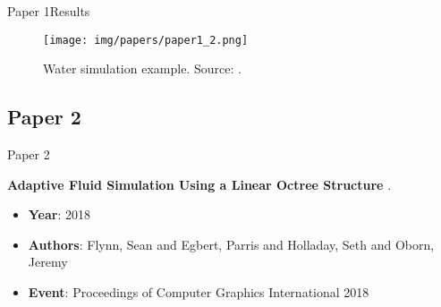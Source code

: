 \documentclass[10pt]{beamer}
\newcommand{\1}{
        	\setbeamertemplate{background}{
        		\texttt{[image: img/1]}
        		\tikz[overlay] \fill[fill opacity=0.75,fill=white] (0,0) rectangle (-\paperwidth,\paperheight);
        	}
}
\begin{document}
\begin{frame}{Paper 1}{Results}
	\begin{figure}
		\centering
		\texttt{[image: img/papers/paper1\_2.png]}
		\caption{Water simulation example. Source: \cite{ando2011particle}.}
	\end{figure}
\end{frame}

\subsection{Paper 2}


\begin{frame}{Paper 2}{}
	
	\begin{block}{}
		\centering
		\textbf{Adaptive Fluid Simulation Using a Linear Octree Structure} \cite{flynn2018adaptive}.
	\end{block}
	
	\begin{itemize}
		\item \textbf{Year}: 2018
		\item \textbf{Authors}: Flynn, Sean and Egbert, Parris and Holladay, Seth and Oborn, Jeremy
		\item \textbf{Event}: Proceedings of Computer Graphics International 2018
	\end{itemize}
\end{frame}
\end{document}
